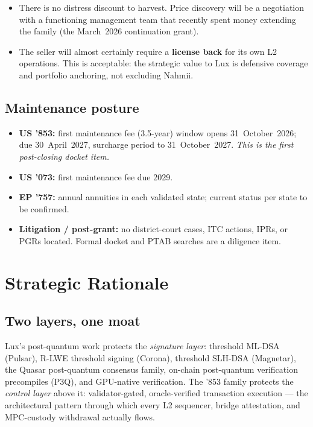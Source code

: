 \documentclass[11pt,a4paper]{article}
\begin{document}
\begin{itemize}[leftmargin=1.4em]
  \item There is no distress discount to harvest. Price discovery will
  be a negotiation with a functioning management team that recently
  spent money extending the family (the March~2026 continuation grant).
  \item The seller will almost certainly require a \textbf{license back}
  for its own L2 operations. This is acceptable: the strategic value to
  Lux is defensive coverage and portfolio anchoring, not excluding
  Nahmii.
\end{itemize}

\subsection{Maintenance posture}

\begin{itemize}[leftmargin=1.4em]
  \item \textbf{US '853:} first maintenance fee (3.5-year) window opens
  31~October~2026; due 30~April~2027, surcharge period to
  31~October~2027. \emph{This is the first post-closing docket item.}
  \item \textbf{US '073:} first maintenance fee due 2029.
  \item \textbf{EP '757:} annual annuities in each validated state;
  current status per state to be confirmed.
  \item \textbf{Litigation / post-grant:} no district-court cases, ITC
  actions, IPRs, or PGRs located. Formal docket and PTAB searches are a
  diligence item.
\end{itemize}

\section{Strategic Rationale}

\subsection{Two layers, one moat}

Lux's post-quantum work protects the \emph{signature layer}: threshold
ML-DSA (Pulsar), R-LWE threshold signing (Corona), threshold SLH-DSA
(Magnetar), the Quasar post-quantum consensus family, on-chain
post-quantum verification precompiles (P3Q), and GPU-native
verification. The '853 family protects the \emph{control layer} above
it: validator-gated, oracle-verified transaction execution --- the
architectural pattern through which every L2 sequencer, bridge
attestation, and MPC-custody withdrawal actually flows.
\end{document}
